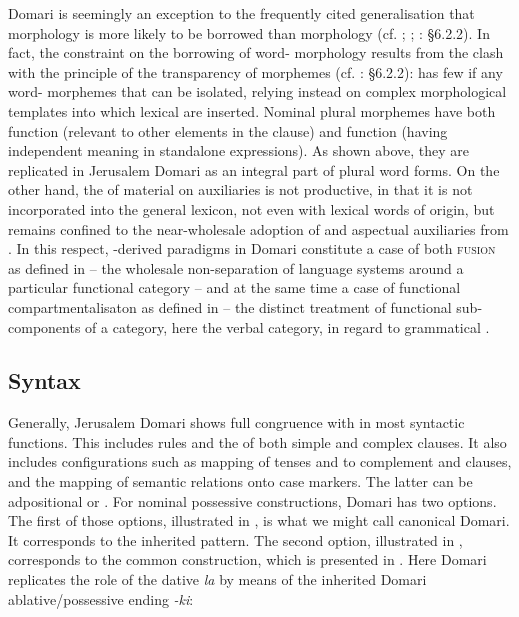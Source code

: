 \documentclass[output=paper]{langsci/langscibook}
\begin{document}
Domari is seemingly an exception to the frequently cited generalisation that  morphology is more likely to be borrowed than  morphology (cf. \citealt{Moravcsik1978}; \citealt{Field2002}; \citealt{Matras2009}: §6.2.2). In fact, the constraint on the borrowing of word- morphology results from the clash with the principle of the transparency of morphemes (cf. \citealt{Matras2009}: §6.2.2):  has few if any word- morphemes that can be isolated, relying instead on complex morphological templates into which lexical  are inserted. Nominal plural morphemes have both  function (relevant to other elements in the clause) and  function (having independent meaning in standalone expressions). As shown above, they are replicated in Jerusalem Domari as an integral part of  plural word forms. On the other hand, the  of  material on auxiliaries is not productive, in that it is not incorporated into the general lexicon, not even with lexical words of  origin, but remains confined to the near-wholesale adoption of  and aspectual auxiliaries from . In this respect, -derived  paradigms in Domari constitute a case of both \textsc{fusion} as defined in \citet{Matras2009} – the wholesale non-separation of language systems around a particular functional category – and at the same time a case of functional compartmentalisaton as defined in \citet{Matras2015} – the distinct treatment of functional sub-components of a category, here the verbal category, in regard to grammatical . 

\subsection{Syntax
}

Generally, Jerusalem Domari shows full congruence with   in most syntactic functions. This includes  rules and the  of both simple and complex clauses. It also includes configurations such as mapping of tenses and  to complement and  clauses, and the mapping of semantic relations onto case markers. The latter can be adpositional or . For nominal possessive constructions, Domari has two options. The first of those options, illustrated in , is what we might call canonical Domari. It corresponds to the inherited  pattern. The second option, illustrated in , corresponds to the common   construction, which is presented in . Here Domari replicates the role of the  dative  \textit{la} by means of the inherited Domari ablative/possessive  ending \textit{-ki}:
\end{document}
